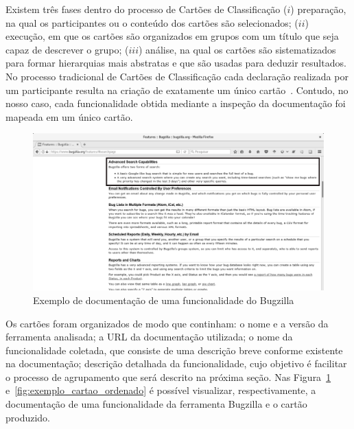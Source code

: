 Existem três fases dentro do processo de Cartões de Classificação ($i$)
preparação, na qual os participantes ou o conteúdo dos cartões são selecionados;
($ii$) execução, em que os cartões são organizados em grupos com um título que
seja capaz de descrever o grupo; ($iii$) análise, na qual os cartões são
sistematizados para formar hierarquias mais abstratas e que são usadas para
deduzir resultados. No processo tradicional de Cartões de Classificação cada
declaração realizada por um participante resulta na criação de exatamente um
único cartão~\cite{just2008towards}. Contudo, no nosso caso, cada funcionalidade
obtida mediante a inspeção da documentação foi mapeada em um único cartão.

\begin{figure}[htpb]
	\centering
	\includegraphics[width=1.0\linewidth]{./chapter-estudo-funcionalidades-fgrm/img/documentacao_bugzilla.png}
	\caption{Exemplo de documentação de uma funcionalidade do Bugzilla}
\label{fig:documentacao_bugzilla}
\end{figure}

Os cartões foram organizados de modo que continham: o nome e a versão da
ferramenta analisada; a URL da documentação utilizada; o nome da funcionalidade
coletada, que consiste de uma descrição breve conforme existente na
documentação; descrição detalhada da funcionalidade, cujo objetivo é facilitar o
processo de agrupamento que será descrito na próxima seção. Nas
Figura~\ref{fig:documentacao_bugzilla} e~\ref{fig:exemplo_cartao_ordenado} é
possível visualizar, respectivamente, a documentação de uma funcionalidade da
ferramenta Bugzilla e o cartão produzido.

